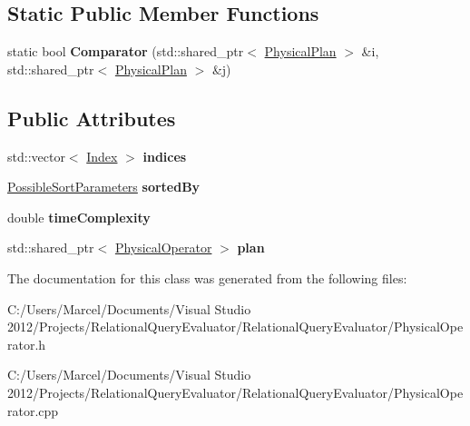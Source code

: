 \subsection*{Static Public Member Functions}
\begin{DoxyCompactItemize}
\item 
\hypertarget{class_physical_plan_a52cbdf31b5d5c9dcdc6730dd1b516e7b}{static bool {\bfseries Comparator} (std\+::shared\+\_\+ptr$<$ \hyperlink{class_physical_plan}{Physical\+Plan} $>$ \&i, std\+::shared\+\_\+ptr$<$ \hyperlink{class_physical_plan}{Physical\+Plan} $>$ \&j)}\label{class_physical_plan_a52cbdf31b5d5c9dcdc6730dd1b516e7b}

\end{DoxyCompactItemize}
\subsection*{Public Attributes}
\begin{DoxyCompactItemize}
\item 
\hypertarget{class_physical_plan_a4d8ba56ef7d228a2a11176da541af5ef}{std\+::vector$<$ \hyperlink{class_index}{Index} $>$ {\bfseries indices}}\label{class_physical_plan_a4d8ba56ef7d228a2a11176da541af5ef}

\item 
\hypertarget{class_physical_plan_a6a49fcbbcb8e22d1f573106de5847c45}{\hyperlink{class_possible_sort_parameters}{Possible\+Sort\+Parameters} {\bfseries sorted\+By}}\label{class_physical_plan_a6a49fcbbcb8e22d1f573106de5847c45}

\item 
\hypertarget{class_physical_plan_a2176d32a64b58406206181395c4127bc}{double {\bfseries time\+Complexity}}\label{class_physical_plan_a2176d32a64b58406206181395c4127bc}

\item 
\hypertarget{class_physical_plan_a97349262f468410057d66f00334003a5}{std\+::shared\+\_\+ptr$<$ \hyperlink{class_physical_operator}{Physical\+Operator} $>$ {\bfseries plan}}\label{class_physical_plan_a97349262f468410057d66f00334003a5}

\end{DoxyCompactItemize}


The documentation for this class was generated from the following files\+:\begin{DoxyCompactItemize}
\item 
C\+:/\+Users/\+Marcel/\+Documents/\+Visual Studio 2012/\+Projects/\+Relational\+Query\+Evaluator/\+Relational\+Query\+Evaluator/Physical\+Operator.\+h\item 
C\+:/\+Users/\+Marcel/\+Documents/\+Visual Studio 2012/\+Projects/\+Relational\+Query\+Evaluator/\+Relational\+Query\+Evaluator/Physical\+Operator.\+cpp\end{DoxyCompactItemize}
